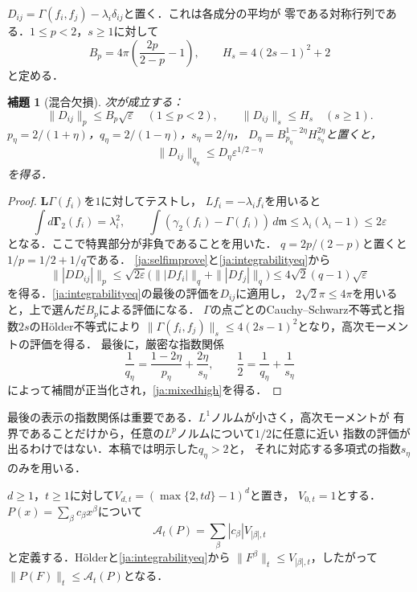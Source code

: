 \documentclass[12pt]{amsart}
\theoremstyle{definition}
\theoremstyle{remark}
\numberwithin{equation}{section}
\newcommand{\dm}{\,d\mathfrak m}
\newcommand{\eps}{\varepsilon}
\theoremstyle{plain}
\newtheorem{jalem}[thm]{補題}
\begin{document}
$D_{ij}=\Gamma(f_i,f_j)-\lambda_i\delta_{ij}$と置く．これは各成分の平均が
零である対称行列である．$1\leq p<2$，$s\geq1$に対して
\begin{equation}\label{ja:constantsB}
 B_p=4\pi\left(\frac{2p}{2-p}-1\right),\qquad
 H_s=4(2s-1)^2+2
\end{equation}
と定める．
\begin{jalem}[混合欠損]\label{ja:mixed}
次が成立する：
\begin{equation}\label{ja:mixedlow}
 \|D_{ij}\|_p\leq B_p\sqrt\eps\quad(1\leq p<2),\qquad
 \|D_{ij}\|_s\leq H_s\quad(s\geq1).
\end{equation}
$p_\eta=2/(1+\eta)$，$q_\eta=2/(1-\eta)$，$s_\eta=2/\eta$，
$D_\eta=B_{p_\eta}^{1-2\eta}H_{s_\eta}^{2\eta}$と置くと，
\begin{equation}\label{ja:mixedhigh}
 \|D_{ij}\|_{q_\eta}\leq D_\eta\eps^{1/2-\eta}
\end{equation}
を得る．
\end{jalem}
\begin{proof}
$\boldsymbol L\Gamma(f_i)$を$1$に対してテストし，
$Lf_i=-\lambda_i f_i$を用いると
\[
 \int d\boldsymbol\Gamma_2(f_i)=\lambda_i^2,\qquad
 \int(\gamma_2(f_i)-\Gamma(f_i))\dm
 \leq\lambda_i(\lambda_i-1)\leq2\eps
\]
となる．ここで特異部分が非負であることを用いた．
$q=2p/(2-p)$と置くと$1/p=1/2+1/q$である．
\eqref{ja:selfimprove}と\eqref{ja:integrabilityeq}から
\[
 \||DD_{ij}|\|_p
 \leq\sqrt{2\eps}\bigl(\||Df_i|\|_q+\||Df_j|\|_q\bigr)
 \leq4\sqrt2(q-1)\sqrt\eps
\]
を得る．\eqref{ja:integrabilityeq}の最後の評価を$D_{ij}$に適用し，
$2\sqrt2\pi\leq4\pi$を用いると，上で選んだ$B_p$による評価になる．
$\Gamma$の点ごとのCauchy--Schwarz不等式と指数$2s$のH\"older不等式により
$\|\Gamma(f_i,f_j)\|_s\leq4(2s-1)^2$となり，高次モーメントの評価を得る．
最後に，厳密な指数関係
\[
 \frac1{q_\eta}=\frac{1-2\eta}{p_\eta}+
                  \frac{2\eta}{s_\eta},\qquad
 \frac12=\frac1{q_\eta}+\frac1{s_\eta}
\]
によって補間が正当化され，\eqref{ja:mixedhigh}を得る．
\end{proof}
最後の表示の指数関係は重要である．$L^1$ノルムが小さく，高次モーメントが
有界であることだけから，任意の$L^p$ノルムについて$1/2$に任意に近い
指数の評価が出るわけではない．本稿では明示した$q_\eta>2$と，
それに対応する多項式の指数$s_\eta$のみを用いる．

$d\geq1$，$t\geq1$に対して$V_{d,t}=(\max\{2,td\}-1)^d$と置き，
$V_{0,t}=1$とする．$P(x)=\sum_\beta c_\beta x^\beta$について
\begin{equation}\label{ja:polynorm}
 \mathcal A_t(P)=\sum_\beta|c_\beta|V_{|\beta|,t}
\end{equation}
と定義する．H\"olderと\eqref{ja:integrabilityeq}から
$\|F^\beta\|_t\leq V_{|\beta|,t}$，したがって
$\|P(F)\|_t\leq\mathcal A_t(P)$となる．
\end{document}
